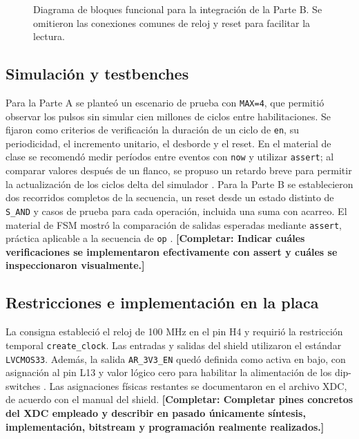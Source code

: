 \documentclass[conference]{IEEEtran}
\newcommand{\completar}[1]{\textcolor{pendiente}{\textbf{[Completar: #1]}}}
\begin{document}
\begin{figure}[!t]
\centering
{}
\caption{Diagrama de bloques funcional para la integración de la Parte B. Se omitieron las conexiones comunes de reloj y reset para facilitar la lectura.}\label{fig:bloques}
\end{figure}

\subsection{Simulación y testbenches}
Para la Parte A se planteó un escenario de prueba con \texttt{MAX=4}, que permitió observar los pulsos sin simular cien millones de ciclos entre habilitaciones. Se fijaron como criterios de verificación la duración de un ciclo de \texttt{en}, su periodicidad, el incremento unitario, el desborde y el reset. En el material de clase se recomendó medir períodos entre eventos con \texttt{now} y utilizar \texttt{assert}; al comparar valores después de un flanco, se propuso un retardo breve para permitir la actualización de los ciclos delta del simulador \cite{cursodiv}. Para la Parte B se establecieron dos recorridos completos de la secuencia, un reset desde un estado distinto de \texttt{S\_AND} y casos de prueba para cada operación, incluida una suma con acarreo. El material de FSM mostró la comparación de salidas esperadas mediante \texttt{assert}, práctica aplicable a la secuencia de \texttt{op} \cite{cursofsm}. \completar{Indicar cuáles verificaciones se implementaron efectivamente con assert y cuáles se inspeccionaron visualmente.}

\subsection{Restricciones e implementación en la placa}
La consigna estableció el reloj de 100 MHz en el pin H4 y requirió la restricción temporal \texttt{create\_clock}. Las entradas y salidas del shield utilizaron el estándar \texttt{LVCMOS33}. Además, la salida \texttt{AR\_3V3\_EN} quedó definida como activa en bajo, con asignación al pin L13 y valor lógico cero para habilitar la alimentación de los dip-switches \cite{consigna}. Las asignaciones físicas restantes se documentaron en el archivo XDC, de acuerdo con el manual del shield. \completar{Completar pines concretos del XDC empleado y describir en pasado únicamente síntesis, implementación, bitstream y programación realmente realizados.}
\end{document}
